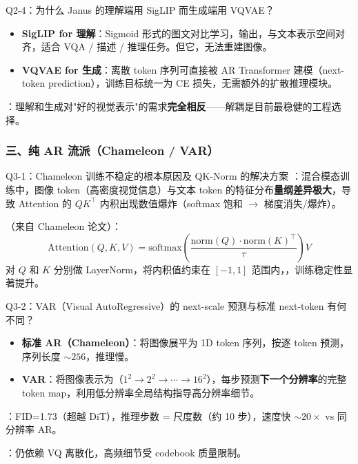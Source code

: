 \begin{conceptbox}{Q2-4：为什么 Janus 的理解端用 SigLIP 而生成端用 VQVAE？}
\begin{itemize}
  \item \textbf{SigLIP for 理解}：Sigmoid 形式的图文对比学习，输出，与文本表示空间对齐，适合 VQA / 描述 / 推理任务。但它，无法重建图像。
  \item \textbf{VQVAE for 生成}：离散 token 序列可直接被 AR Transformer 建模（next-token prediction），训练目标统一为 CE 损失，无需额外的扩散推理模块。
\end{itemize}
：理解和生成对"好的视觉表示"的需求\textbf{完全相反}——解耦是目前最稳健的工程选择。
\end{conceptbox}

\subsubsection{三、纯 AR 流派（Chameleon / VAR）}

\begin{conceptbox}{Q3-1：Chameleon 训练不稳定的根本原因及 QK-Norm 的解决方案}
：混合模态训练中，图像 token（高密度视觉信息）与文本 token 的特征分布\textbf{量纲差异极大}，导致 Attention 的 $QK^\top$ 内积出现数值爆炸（softmax 饱和 $\to$ 梯度消失/爆炸）。

（来自 Chameleon 论文）：
\[
\text{Attention}(Q, K, V) = \text{softmax}\!\left(\frac{\text{norm}(Q) \cdot \text{norm}(K)^\top}{\tau}\right) V
\]
对 $Q$ 和 $K$ 分别做 LayerNorm，将内积值约束在 $[-1, 1]$ 范围内，，训练稳定性显著提升。

\end{conceptbox}

\begin{conceptbox}{Q3-2：VAR（Visual AutoRegressive）的 next-scale 预测与标准 next-token 有何不同？}
\begin{itemize}
  \item \textbf{标准 AR（Chameleon）}：将图像展平为 1D token 序列，按逐 token 预测，序列长度 $\sim 256$，推理慢。
  \item \textbf{VAR}：将图像表示为（$1^2 \to 2^2 \to \cdots \to 16^2$），每步预测\textbf{下一个分辨率}的完整 token map，利用低分辨率全局结构指导高分辨率细节。
\end{itemize}
：FID=1.73（超越 DiT），推理步数 = 尺度数（约 10 步），速度快 $\sim 20\times$ vs 同分辨率 AR。

：仍依赖 VQ 离散化，高频细节受 codebook 质量限制。
\end{conceptbox}

